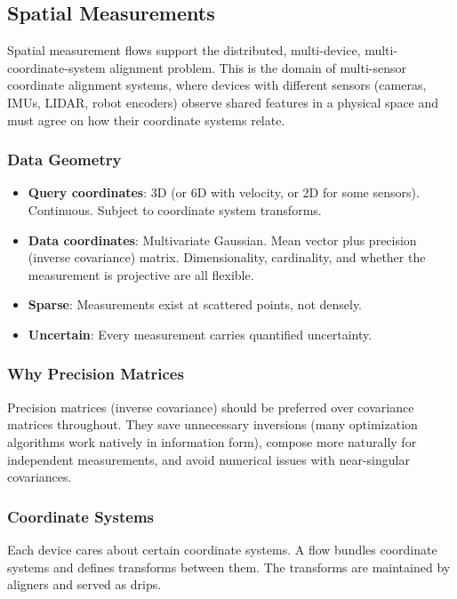 \documentclass[11pt, letterpaper]{article}
\begin{document}
\subsection{Spatial Measurements}
\label{sec:ex-spatial}

Spatial measurement flows support the distributed, multi-device, multi-coordinate-system
alignment problem. This is the domain of multi-sensor coordinate alignment systems, where devices with different sensors
(cameras, IMUs, LIDAR, robot encoders) observe shared features in a physical space and
must agree on how their coordinate systems relate.

\subsubsection{Data Geometry}
\begin{itemize}[leftmargin=2em]
  \item \textbf{Query coordinates}: 3D (or 6D with velocity, or 2D for some sensors).
    Continuous. Subject to coordinate system transforms.
  \item \textbf{Data coordinates}: Multivariate Gaussian. Mean vector plus precision
    (inverse covariance) matrix. Dimensionality, cardinality, and whether the
    measurement is projective are all flexible.
  \item \textbf{Sparse}: Measurements exist at scattered points, not densely.
  \item \textbf{Uncertain}: Every measurement carries quantified uncertainty.
\end{itemize}

\subsubsection{Why Precision Matrices}

Precision matrices (inverse covariance) should be preferred over covariance matrices
throughout. They save unnecessary inversions (many optimization algorithms work natively
in information form), compose more naturally for independent measurements, and avoid
numerical issues with near-singular covariances.

\subsubsection{Coordinate Systems}

Each device cares about certain coordinate systems. A flow bundles coordinate systems
and defines transforms between them. The transforms are maintained by aligners and
served as drips.
\end{document}

